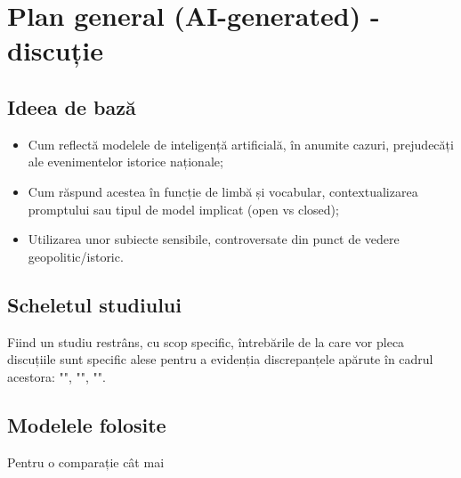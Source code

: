 \documentclass[a4paper,11pt]{article}
\title{}
\author{}
\begin{document}
\maketitle

\section{Plan general (AI-generated) - discuție}
\subsection{Ideea de bază}
\begin{itemize}
    \item Cum reflectă modelele de inteligență artificială, în anumite cazuri, prejudecăți ale evenimentelor istorice naționale;
    \item Cum răspund acestea în funcție de limbă și vocabular, contextualizarea promptului sau tipul de model implicat (open vs closed);
    \item Utilizarea unor subiecte sensibile, controversate din punct de vedere geopolitic/istoric.
\end{itemize}

\subsection{Scheletul studiului}
Fiind un studiu restrâns, cu scop specific, întrebările de la care vor pleca discuțiile sunt specific alese pentru a evidenția discrepanțele apărute în cadrul acestora: "", "", "".



\subsection{Modelele folosite}
Pentru o comparație cât mai 

\subsection{}

\subsection{}
\end{document}
